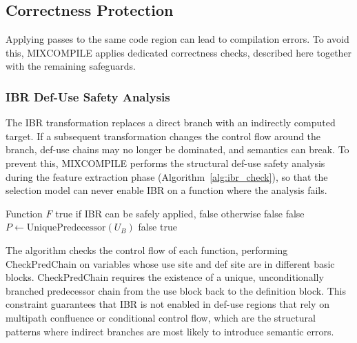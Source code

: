 \documentclass[5p,times,authoryear]{elsarticle}
\theoremstyle{plain}
\theoremstyle{definition}
\theoremstyle{remark}
\begin{document}
\subsection{Correctness Protection}

Applying passes to the same code region can lead to compilation errors. To avoid
this, MIXCOMPILE applies dedicated correctness checks, described here together with
the remaining safeguards.

\subsubsection{IBR Def-Use Safety Analysis}

The IBR transformation replaces a direct branch with an indirectly computed target.
If a subsequent transformation changes the control flow around the branch, def-use
chains may no longer be dominated, and semantics can break. To prevent this, MIXCOMPILE
performs the structural def-use safety analysis during the feature extraction phase
(Algorithm~\ref{alg:ibr_check}), so that the selection model can never enable IBR on a
function where the analysis fails.

\begin{algorithm}[!t]
\footnotesize
\caption{IBR Compatibility Check (CheckIBRCompatibility)}
\label{alg:ibr_check}
\begin{algorithmic}[1]
    \Require Function $F$
    \Ensure true if IBR can be safely applied, false otherwise
                    \Return false
                \EndIf
                     \Return false \EndIf
                    \State $P \gets \text{UniquePredecessor}(U_B)$
                     \Return false \EndIf
                \EndIf
            \EndFor
        \EndFor
    \EndFor
    \Return true
\end{algorithmic}
\end{algorithm}

The algorithm checks the control flow of each function, performing CheckPredChain on
variables whose use site and def site are in different basic blocks. CheckPredChain
requires the existence of a unique, unconditionally branched predecessor chain from
the use block back to the definition block. This constraint guarantees that IBR is not
enabled in def-use regions that rely on multipath confluence or conditional control
flow, which are the structural patterns where indirect branches are most likely to
introduce semantic errors.
\end{document}
